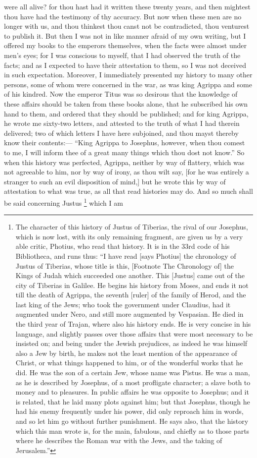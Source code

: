 were all alive? for thou hast had it written these twenty years, and then
mightest thou have had the testimony of thy accuracy. But now when these
men are no longer with us, and thou thinkest thou canst not be
contradicted, thou venturest to publish it. But then I was not in like
manner afraid of my own writing, but I offered my books to the emperors
themselves, when the facts were almost under men's eyes; for I was
conscious to myself, that I had observed the truth of the facts; and as I
expected to have their attestation to them, so I was not deceived in such
expectation. Moreover, I immediately presented my history to many other
persons, some of whom were concerned in the war, as was king Agrippa and
some of his kindred. Now the emperor Titus was so desirous that the
knowledge of these affairs should be taken from these books alone, that he
subscribed his own hand to them, and ordered that they should be
published; and for king Agrippa, he wrote me sixty-two letters, and
attested to the truth of what I had therein delivered; two of which
letters I have here subjoined, and thou mayst thereby know their contents:—
``King Agrippa to Josephus, however, when thou comest to me, I will inform
thee of a great many things which thou dost not know.'' So when this
history was perfected, Agrippa, neither by way of flattery, which was not
agreeable to him, nor by way of irony, as thou wilt say, [for he was
entirely a stranger to such an evil disposition of mind,] but he wrote
this by way of attestation to what was true, as all that read histories
may do. And so much shall be said concerning Justus \footnote{The character of this
history of Justus of Tiberias, the rival of our Josephus, which is now
lost, with its only remaining fragment, are given us by a very able
critic, Photius, who read that history. It is in the 33rd code of his
Bibliotheca, and runs thus: ``I have read [says Photius] the chronology of
Justus of Tiberias, whose title is this, [Footnote The Chronology of] the
Kings of Judah which succeeded one another. This [Justus] came out of the
city of Tiberias in Galilee. He begins his history from Moses, and ends it
not till the death of Agrippa, the seventh [ruler] of the family of Herod,
and the last king of the Jews; who took the government under Claudius, had
it augmented under Nero, and still more augmented by Vespasian. He died in
the third year of Trajan, where also his history ends. He is very concise
in his language, and slightly passes over those affairs that were most
necessary to be insisted on; and being under the Jewish prejudices, as
indeed he was himself also a Jew by birth, he makes not the least mention
of the appearance of Christ, or what things happened to him, or of the
wonderful works that he did. He was the son of a certain Jew, whose name
was Pistus. He was a man, as he is described by Josephus, of a most
profligate character; a slave both to money and to pleasures. In public
affairs he was opposite to Josephus; and it is related, that he laid many
plots against him; but that Josephus, though he had his enemy frequently
under his power, did only reproach him in words, and so let him go without
further punishment. He says also, that the history which this man wrote
is, for the main, fabulous, and chiefly as to those parts where he
describes the Roman war with the Jews, and the taking of Jerusalem.''} which I am

